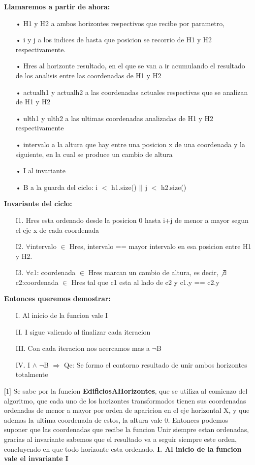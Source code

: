 \bigskip
\textbf{Llamaremos a partir de ahora:}
\begin{itemize}
\item[•]H1 y H2 a ambos horizontes respectivos que recibe por parametro, 
\item[•]i y j a los indices de hasta que posicion se recorrio de H1 y H2 respectivamente.
\item[•]Hres al horizonte resultado, en el que se van a ir acumulando el resultado de los analisis entre las coordenadas de H1 y H2
\item[•]actualh1 y actualh2 a las coordenadas actuales respectivas que se analizan de H1 y H2
\item[•]ulth1 y ulth2 a las ultimas coordenadas analizadas de H1 y H2 respectivamente
\item[•]intervalo a la altura que hay entre una posicion x de una coordenada y la siguiente, en la cual se produce un cambio de altura
\item[•]I al invariante
\item[•]B a la guarda del ciclo: i $<$ h1.size() $\vert\vert$ j $<$ h2.size()
\end{itemize}
\bigskip
\textbf{Invariante del ciclo:} 
\begin{itemize}
\item[I1.] Hres esta ordenado desde la posicion 0 hasta i+j de menor a mayor segun el eje x de cada coordenada
\item[I2.] $\forall$intervalo $\in$ Hres, intervalo == mayor intervalo en esa posicion entre H1 y H2.
\item[I3.] $\forall$c1: coordenada $\in$ Hres marcan un cambio de altura, es decir, $\not\exists$ c2:coordenada $\in$ Hres tal que c1 esta al lado de c2 y c1.y == c2.y
\end{itemize}
\bigskip
\textbf{Entonces queremos demostrar:}
\begin{itemize}
\item[I.] Al inicio de la funcion vale I
\item[II.] I sigue valiendo al finalizar cada iteracion
\item[III.] Con cada iteracion nos acercamos mas a $\neg$B
\item[IV.] I $\wedge$ $\neg$B $\Rightarrow$ Qc: Se formo el contorno resultado de unir ambos horizontes totalmente
\end{itemize}
\null
\vfill
[1] Se sabe por la funcion \textbf{EdificiosAHorizontes}, que se utiliza al comienzo del algoritmo, que cada uno de los horizontes transformados tienen sus coordenadas ordenadas de menor a mayor por orden de aparicion en el eje horizontal X, y que ademas la ultima coordenada de estos, la altura vale 0. Entonces podemos suponer que las coordenadas que recibe la funcion Unir siempre estan ordenadas, gracias al invariante sabemos que el resultado va a seguir siempre este orden, concluyendo en que todo horizonte esta ordenado.
\newpage
\noindent \textbf{I. Al inicio de la funcion vale el invariante I}

